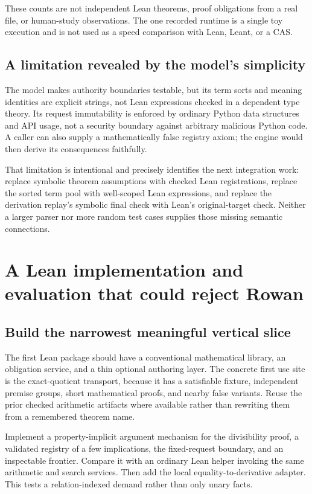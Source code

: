 \documentclass[11pt,letterpaper]{article}
\theoremstyle{definition}\newtheorem{definition}[theorem]{Definition}
\theoremstyle{remark}\newtheorem{remark}[theorem]{Remark}
\begin{document}
These counts are not independent Lean theorems, proof obligations from a real
file, or human-study observations. The one recorded runtime is a single toy
execution and is not used as a speed comparison with Lean, Leant, or a CAS.

\subsection{A limitation revealed by the model's simplicity}
The model makes authority boundaries testable, but its term sorts and meaning
identities are explicit strings, not Lean expressions checked in a dependent
type theory. Its request immutability is enforced by ordinary Python data
structures and API usage, not a security boundary against arbitrary malicious
Python code. A caller can also supply a mathematically false registry axiom;
the engine would then derive its consequences faithfully.

That limitation is intentional and precisely identifies the next integration
work: replace symbolic theorem assumptions with checked Lean registrations,
replace the sorted term pool with well-scoped Lean expressions, and replace
the derivation replay's symbolic final check with Lean's original-target check.
Neither a larger parser nor more random test cases supplies those missing
semantic connections.

\section{A Lean implementation and evaluation that could reject Rowan}
\label{sec:evaluation}

\subsection{Build the narrowest meaningful vertical slice}
The first Lean package should have a conventional mathematical library, an
obligation service, and a thin optional authoring layer. The concrete first
use site is the exact-quotient transport, because it has a satisfiable fixture,
independent premise groups, short mathematical proofs, and nearby false
variants. Reuse the prior checked arithmetic artifacts where available rather
than rewriting them from a remembered theorem name.

Implement a property-implicit argument mechanism for the divisibility proof,
a validated registry of a few implications, the fixed-request boundary, and
an inspectable frontier. Compare it with an ordinary Lean helper invoking the
same arithmetic and search services. Then add the local equality-to-derivative
adapter. This tests a relation-indexed demand rather than only unary facts.
\end{document}

